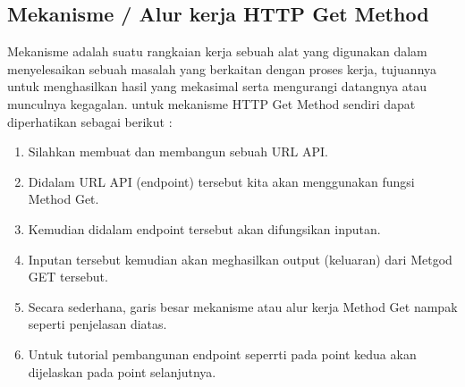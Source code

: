 \subsection{Mekanisme / Alur kerja HTTP Get Method}
Mekanisme adalah suatu rangkaian kerja sebuah alat yang digunakan dalam menyelesaikan sebuah masalah yang berkaitan dengan proses kerja, tujuannya untuk menghasilkan hasil yang mekasimal serta mengurangi datangnya atau munculnya kegagalan. untuk mekanisme HTTP Get Method sendiri dapat diperhatikan sebagai berikut :
\begin{enumerate}
  \item Silahkan membuat dan membangun sebuah URL API.
  \item Didalam URL API (endpoint) tersebut kita akan menggunakan fungsi Method Get.
  \item Kemudian didalam endpoint tersebut akan difungsikan inputan.
  \item Inputan tersebut kemudian akan meghasilkan output (keluaran) dari Metgod GET tersebut.
  \item Secara sederhana, garis besar mekanisme atau alur kerja Method Get nampak seperti penjelasan diatas.
  \item Untuk tutorial pembangunan endpoint seperrti pada point kedua akan dijelaskan pada point selanjutnya.
\end{enumerate}

